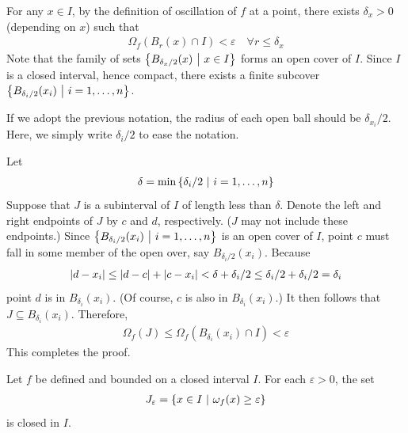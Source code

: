 \documentclass[thmcnt=section, 12pt]{my-elegantbook}
\begin{document}
\begin{solution}
	For any $x \in I$, 
	by the definition of oscillation of $f$ at a point,
	there exists $\delta_x > 0$ (depending on $x$) such that 
	\begin{align*}
		\Omega_f( B_r(x) \cap I ) < \varepsilon
		\quad \forall r \leq \delta_x
	\end{align*}
	Note that the family of sets $\left\{ B_{\delta_x / 2} (x) \ \middle| \ x \in I \right\}$
	forms an open cover of $I$.
	Since $I$ is a closed interval, hence compact,
	there exists a finite 
	subcover $\left\{ B_{\delta_i / 2}(x_i) \ \middle| \ i = 1, \ldots, n \right\}$.
	\begin{note}
		If we adopt the previous notation, 
		the radius of each open ball should be $\delta_{x_i} / 2$.
		Here, we simply write $\delta_i / 2$ to ease the notation.
	\end{note}

	Let
	\begin{align*}
		\delta = \min \left\{ \delta_i / 2 \ \middle| \ i = 1, \ldots, n \right\}
	\end{align*}
	Suppose that $J$ is a subinterval of $I$ 
	of length less than $\delta$.
	Denote the left and right endpoints of $J$ by $c$ and $d$,
	respectively. ($J$ may not include these endpoints.)
	Since $\left\{ B_{\delta_i / 2}(x_i) \ \middle| \ i=1, \ldots, n \right\}$
	is an open cover of $I$, 
	point $c$ must fall in some member of the open over, 
	say $B_{\delta_i / 2}(x_i)$.
	Because
	\begin{align*}
		\left\lvert d - x_i \right\rvert
		\leq \left\lvert d - c \right\rvert + \left\lvert c - x_i \right\rvert
		< \delta + \delta_i / 2 
		\leq \delta_i / 2 + \delta_i / 2
		= \delta_i
	\end{align*}
	point $d$ is in $B_{\delta_i}(x_i)$.
	(Of course, $c$ is also in $B_{\delta_i}(x_i)$.)
	It then follows that $J \subseteq B_{\delta_i}(x_i)$.
	Therefore, 
	\begin{align*}
		\Omega_f(J) \leq \Omega_f(B_{\delta_i}(x_i) \cap I) 
		< \varepsilon
	\end{align*}
	This completes the proof.
\end{solution}


\begin{lemma} \label{lem:7}
	Let $f$ be defined and bounded on a closed interval $I$.
	For each $\varepsilon > 0$, the set
	\begin{align*}
		J_\varepsilon = \left\{ x \in I \ \middle| \ \omega_f(x) \geq \varepsilon \right\}
	\end{align*}
	is closed in $I$.
\end{lemma}
\end{document}

